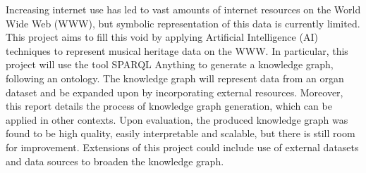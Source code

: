 Increasing internet use has led to vast amounts of internet resources on the World Wide Web (WWW), but symbolic representation of this data is currently limited. This project aims to fill this void by applying Artificial Intelligence (AI) techniques to represent musical heritage data on the WWW. In particular, this project will use the tool SPARQL Anything to generate a knowledge graph, following an ontology. The knowledge graph will represent data from an organ dataset and be expanded upon by incorporating external resources. Moreover, this report details the process of knowledge graph generation, which can be applied in other contexts. Upon evaluation, the produced knowledge graph was found to be high quality, easily interpretable and scalable, but there is still room for improvement. Extensions of this project could include use of external datasets and data sources to broaden the knowledge graph. 
